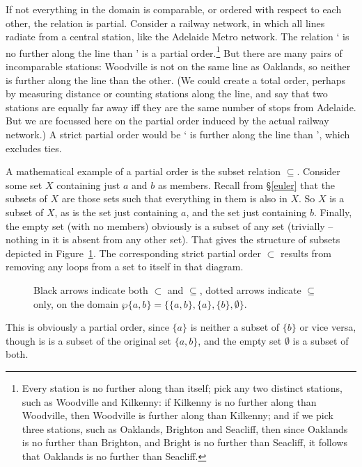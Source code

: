 \begin{earg}
If not everything in the domain is comparable, or ordered with respect to each other, the relation is partial. Consider a railway network, in which all lines radiate from a central station, like the Adelaide Metro network.  The relation ` is no further along the line than ' is a partial order.\footnote{Every station is no further along than itself; pick any two distinct stations, such as Woodville and Kilkenny: if Kilkenny is no further along than Woodville, then Woodville is further along than Kilkenny; and if we pick three stations, such as Oaklands, Brighton and Seacliff, then since Oaklands is no further than Brighton, and Bright is no further than Seacliff, it follows that Oaklands is no further than Seacliff.} But there are many pairs of incomparable stations: Woodville is not on the same line as Oaklands, so neither is further along the line than the other. (We could create a total order, perhaps by measuring distance or counting stations along the line, and say that two stations are equally far away iff they are the same number of stops from Adelaide. But we are focussed here on the partial order induced by the actual railway network.) A strict partial order would be ` is further along the line than ', which excludes ties. 

A mathematical example of a partial order is the subset relation $\subseteq$. Consider some set $X$ containing just $a$ and $b$ as members. Recall from §\ref{euler} that the subsets of $X$ are those sets such that everything in them is also in $X$. So $X$ is a subset of $X$, as is the set just containing $a$, and the set just containing $b$. Finally, the empty set (with no members) obviously is a subset of any set (trivially – nothing in it is absent from any other set). That gives the structure of subsets depicted in Figure~\ref{fig:sbst}. The corresponding strict partial order $\subset$ results from removing any loops from a set to itself in that diagram.
 \begin{figure}
 \caption{Black arrows indicate both $\subset$ and $\subseteq$, dotted arrows indicate $\subseteq$ only, on the domain $\wp\{a,b\}=\{\{a,b\},\{a\},\{b\},\emptyset\}$.\label{fig:sbst}}
 \end{figure} This is obviously a partial order, since $\{a\}$ is neither a subset of $\{b\}$ or vice versa, though is is a subset of the original set $\{a,b\}$, and the empty set $\emptyset$ is a subset of both. 



\end{earg}
